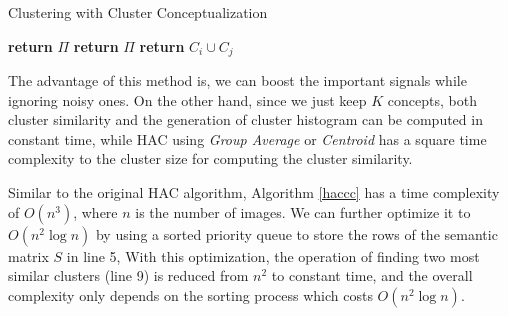 \renewcommand\algorithmicrequire{\textbf{Input:}}
\renewcommand\algorithmicensure {\textbf{Output:}}
\begin{algorithm}[th]
\caption{Clustering with Cluster Conceptualization}
\label{haccc}
\begin{algorithmic}[1]
 
\EndFor
\EndFor
{}
\State \textbf{return} $\Pi$
\EndIf
{}
\EndFor
\State \textbf{return} $\Pi$
\EndFunction
\Statex
{}
\EndIf
\EndFor
\State \textbf{return} {$C_i\cup C_j$}
\EndFunction
\end{algorithmic}
\end{algorithm}

The advantage of this method is,
we can boost the important signals while ignoring noisy ones.
On the other hand, since we just keep $K$ concepts,
both cluster similarity and the generation
of cluster histogram can be computed in constant time,
while HAC using \emph{Group Average} or
\emph{Centroid} has a square time complexity to the cluster size
for computing the cluster similarity.

Similar to the original HAC algorithm, Algorithm \ref{haccc} has
a time complexity of $O(n^3)$, where $n$ is the number of images.
We can further optimize it to $O(n^2\log n)$ by using a sorted priority
queue to store the rows of the semantic matrix $S$ in line 5,
With this optimization, the operation
of finding two most similar clusters (line 9) is reduced from $n^2$ to
constant time, and the overall complexity only depends on the sorting
process which costs $O(n^2 \log n)$.

